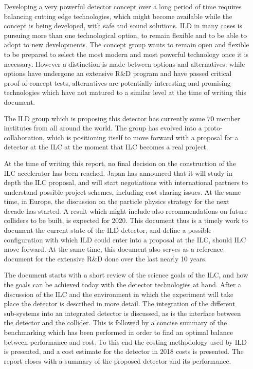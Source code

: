 Developing a very powerful detector concept over a long period of time requires balancing cutting edge technologies, which might become available while the concept is being developed, with safe and sound solutions. ILD in many cases is pursuing more than one technological option, to remain flexible and to be able to adopt to new developments. The concept group  wants to remain open and flexible to be prepared to select the most modern and most powerful technology once it is necessary. 
However a distinction is made between options and alternatives: while options have undergone an extensive R\&D program and have passed critical proof-of-concept tests, alternatives are potentially interesting and promising technologies which have not matured to a similar level at the time of writing this document. 

The ILD group which is proposing this detector has currently some 70 member institutes from all around the world. The group has evolved into a proto-collaboration, which is positioning itself to move forward with a proposal for a detector at the ILC at the moment that ILC becomes a real project.

At the time of writing this report, no final decision on the construction of the ILC accelerator has been reached. Japan has announced that it will study in depth the ILC proposal, and will start negotiations with international partners to understand possible project schemes, including cost sharing issues. At the same time, in Europe, the discussion on the particle physics strategy for the next decade has started. A result which might include also recommendations on future colliders to be built, is expected for 2020. This document thus is a timely work to document the current state of the ILD detector, and define a possible configuration with which ILD could enter into a proposal at the ILC, should ILC move forward. At the same time, this document also serves as a reference document for the extensive R\&D done over the last nearly 10 years. 

The document starts with a short review of the science goals of the ILC, and how the goals can be achieved today with the detector technologies at hand. After a discussion of the ILC and the environment in which the experiment will take place the detector is described in more detail. The integration of the different sub-systems into an integrated detector is discussed, as is the interface between the detector and the collider. This is followed by a concise summary of the benchmarking which has been performed in order to find an optimal balance between performance and cost. To this end the costing methodology used by ILD is presented, and a cost estimate for the detector in 2018 costs is presented. The report closes with a summary of the proposed detector and its performance. 